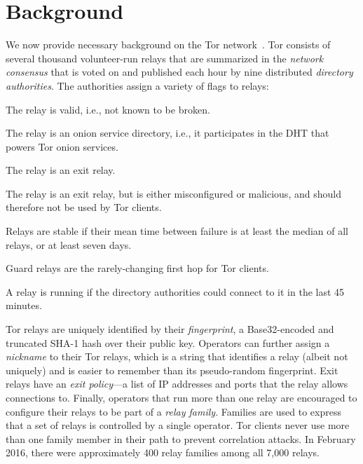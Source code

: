 \section{Background}
\label{sec:background}
We now provide necessary background on the Tor network~\cite{Dingledine2004a}.
Tor consists of several thousand volunteer-run relays that are summarized in the
\emph{network consensus} that is voted on and published each hour by nine
distributed \emph{directory authorities}.  The authorities assign a variety of
flags to relays:

\begin{description}[noitemsep]
	\item[Valid:] The relay is valid, i.e., not known to be broken.
	\item[HSDir:] The relay is an onion service directory, i.e., it participates
		in the DHT that powers Tor onion services.
	\item[Exit:] The relay is an exit relay.
	\item[BadExit:] The relay is an exit relay, but is either misconfigured or
		malicious, and should therefore not be used by Tor clients.
	\item[Stable:] Relays are stable if their mean time between failure is at
		least the median of all relays, or at least seven days.
	\item[Guard:] Guard relays are the rarely-changing first hop for Tor clients.
	\item[Running:] A relay is running if the directory authorities could
		connect to it in the last 45 minutes.
\end{description}

Tor relays are uniquely identified by their \emph{fingerprint}, a
Base32-encoded and truncated SHA-1 hash over their public key.  Operators can
further assign a \emph{nickname} to their Tor relays, which is a string that
identifies a relay (albeit not uniquely) and is easier to remember than its
pseudo-random fingerprint.  Exit relays have an \emph{exit policy}---a list of
IP addresses and ports that the relay allows connections to.  Finally,
operators that run more than one relay are encouraged to configure their relays
to be part of a \emph{relay family}.  Families are used to express that a set
of relays is controlled by a single operator.  Tor clients never use more than
one family member in their path to prevent correlation attacks.  In February
2016, there were approximately 400 relay families among all 7,000 relays.
